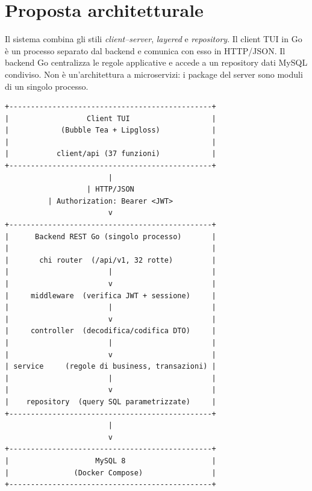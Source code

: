 \documentclass[a4paper,12pt]{article}
\begin{document}
\section{Proposta architetturale}

Il sistema combina gli stili \emph{client--server}, \emph{layered} e \emph{repository}. Il client TUI in Go è un processo separato dal backend e comunica con esso in HTTP/JSON. Il backend Go centralizza le regole applicative e accede a un repository dati MySQL condiviso. Non è un'architettura a microservizi: i package del server sono moduli di un singolo processo.
\newpage

\begin{minipage}{\linewidth}
    
\begin{verbatim}
+-----------------------------------------------+
|                  Client TUI                   |
|            (Bubble Tea + Lipgloss)            |
|                                               |
|           client/api (37 funzioni)            |
+-----------------------------------------------+
                        |                        
                   | HTTP/JSON                   
          | Authorization: Bearer <JWT>          
                        v                        
+-----------------------------------------------+
|      Backend REST Go (singolo processo)       |
|                                               |
|       chi router  (/api/v1, 32 rotte)         |
|                       |                       |
|                       v                       |
|     middleware  (verifica JWT + sessione)     |
|                       |                       |
|                       v                       |
|     controller  (decodifica/codifica DTO)     |
|                       |                       |
|                       v                       |
| service     (regole di business, transazioni) |
|                       |                       |
|                       v                       |
|    repository  (query SQL parametrizzate)     |
+-----------------------------------------------+
                        |                        
                        v                        
+-----------------------------------------------+
|                    MySQL 8                    |
|               (Docker Compose)                |
+-----------------------------------------------+
\end{verbatim}
\end{minipage}
\end{document}
